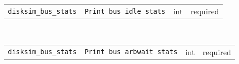 \noindent 
\begin{tabular}{|p{1.5in}|p{3.5in}|p{0.5in}|p{0.5in}|}
\cline{1-4}
\texttt{disksim\_bus\_stats} & \texttt{Print bus idle stats} & int & required \\ 
\cline{1-4}
\end{tabular}\\ 
\noindent 
\begin{tabular}{|p{1.5in}|p{3.5in}|p{0.5in}|p{0.5in}|}
\cline{1-4}
\texttt{disksim\_bus\_stats} & \texttt{Print bus arbwait stats} & int & required \\ 
\cline{1-4}
\end{tabular}\\ 
